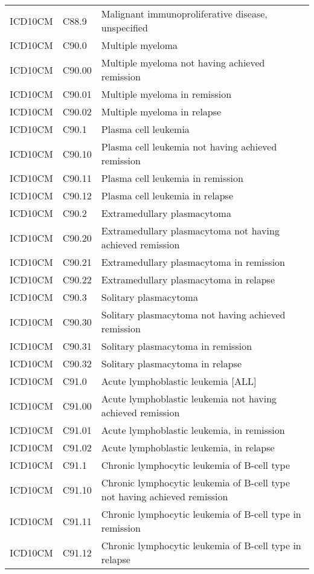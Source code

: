\begin{longtable}{p{}p{}p{}}
  ICD10CM & C88.9 & Malignant immunoproliferative disease, unspecified \\ 
  ICD10CM & C90.0 & Multiple myeloma \\ 
  ICD10CM & C90.00 & Multiple myeloma not having achieved remission \\ 
  ICD10CM & C90.01 & Multiple myeloma in remission \\ 
  ICD10CM & C90.02 & Multiple myeloma in relapse \\ 
  ICD10CM & C90.1 & Plasma cell leukemia \\ 
  ICD10CM & C90.10 & Plasma cell leukemia not having achieved remission \\ 
  ICD10CM & C90.11 & Plasma cell leukemia in remission \\ 
  ICD10CM & C90.12 & Plasma cell leukemia in relapse \\ 
  ICD10CM & C90.2 & Extramedullary plasmacytoma \\ 
  ICD10CM & C90.20 & Extramedullary plasmacytoma not having achieved remission \\ 
  ICD10CM & C90.21 & Extramedullary plasmacytoma in remission \\ 
  ICD10CM & C90.22 & Extramedullary plasmacytoma in relapse \\ 
  ICD10CM & C90.3 & Solitary plasmacytoma \\ 
  ICD10CM & C90.30 & Solitary plasmacytoma not having achieved remission \\ 
  ICD10CM & C90.31 & Solitary plasmacytoma in remission \\ 
  ICD10CM & C90.32 & Solitary plasmacytoma in relapse \\ 
  ICD10CM & C91.0 & Acute lymphoblastic leukemia [ALL] \\ 
  ICD10CM & C91.00 & Acute lymphoblastic leukemia not having achieved remission \\ 
  ICD10CM & C91.01 & Acute lymphoblastic leukemia, in remission \\ 
  ICD10CM & C91.02 & Acute lymphoblastic leukemia, in relapse \\ 
  ICD10CM & C91.1 & Chronic lymphocytic leukemia of B-cell type \\ 
  ICD10CM & C91.10 & Chronic lymphocytic leukemia of B-cell type not having achieved remission \\ 
  ICD10CM & C91.11 & Chronic lymphocytic leukemia of B-cell type in remission \\ 
  ICD10CM & C91.12 & Chronic lymphocytic leukemia of B-cell type in relapse \\ 

\end{longtable}
